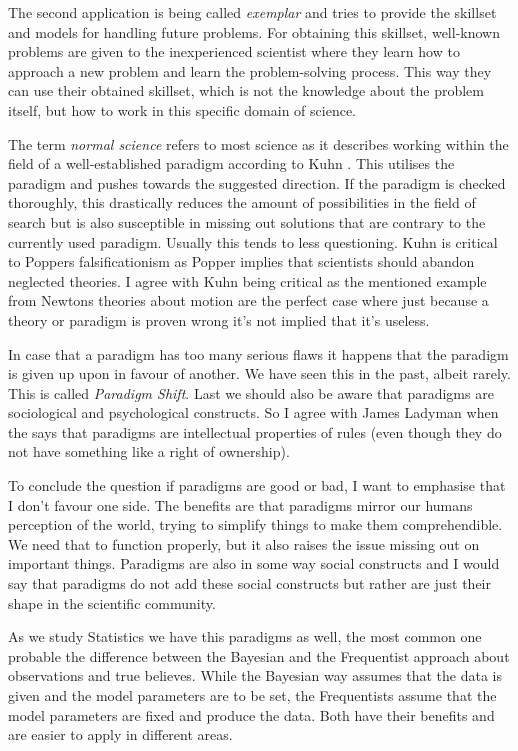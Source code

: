 \documentclass[11pt]{scrartcl}
\begin{document}
The second application is being called \textit{exemplar} and tries to provide the skillset and models for handling future problems. For obtaining this skillset, well-known problems are given to the inexperienced scientist where they learn how to approach a new problem and learn the problem-solving process. This way they can use their obtained skillset, which is not the knowledge about the problem itself, but how to work in this specific domain of science.

The term \textit{normal science} refers to most science as it describes working within the field of a well-established paradigm according to Kuhn \cite[p. 100]{ladyman}. This utilises the paradigm and pushes towards the suggested direction. If the paradigm is checked thoroughly, this drastically reduces the amount of possibilities in the field of search but is also susceptible in missing out solutions that are contrary to the currently used paradigm. Usually this tends to less questioning. Kuhn is critical to Poppers falsificationism \cite[p. 101]{ladyman} as Popper implies that scientists should abandon neglected theories. I agree with Kuhn being critical as the mentioned example from Newtons theories about motion are the perfect case where just because a theory or paradigm is proven wrong it's not implied that it's useless.

In case that a paradigm has too many serious flaws it happens that the paradigm is given up upon in favour of another. We have seen this in the past, albeit rarely. This is called \textit{Paradigm Shift}. Last we should also be aware that paradigms are sociological and psychological constructs. So I agree with James Ladyman when the says that paradigms are intellectual properties of rules (even though they do not have something like a right of ownership).

To conclude the question if paradigms are good or bad, I want to emphasise that I don't favour one side. The benefits are that paradigms mirror our humans perception of the world, trying to simplify things to make them comprehendible. We need that to function properly, but it also raises the issue missing out on important things. Paradigms are also in some way social constructs and I would say that paradigms do not add these social constructs but rather are just their shape in the scientific community.

As we study Statistics we have this paradigms as well, the most common one probable the difference between the Bayesian and the Frequentist approach about observations and true believes. While the Bayesian way assumes that the data is given and the model parameters are to be set, the Frequentists assume that the model parameters are fixed and produce the data. Both have their benefits and are easier to apply in different areas.
\end{document}
